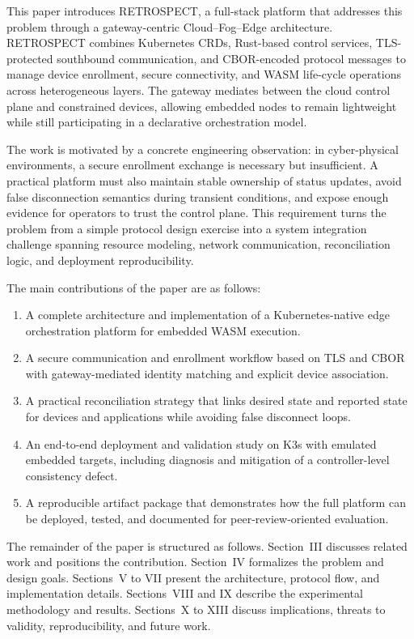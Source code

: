 This paper introduces RETROSPECT, a full-stack platform that addresses this problem through a gateway-centric Cloud--Fog--Edge architecture. RETROSPECT combines Kubernetes CRDs, Rust-based control services, TLS-protected southbound communication, and CBOR-encoded protocol messages to manage device enrollment, secure connectivity, and WASM life-cycle operations across heterogeneous layers. The gateway mediates between the cloud control plane and constrained devices, allowing embedded nodes to remain lightweight while still participating in a declarative orchestration model.

The work is motivated by a concrete engineering observation: in cyber-physical environments, a secure enrollment exchange is necessary but insufficient. A practical platform must also maintain stable ownership of status updates, avoid false disconnection semantics during transient conditions, and expose enough evidence for operators to trust the control plane. This requirement turns the problem from a simple protocol design exercise into a system integration challenge spanning resource modeling, network communication, reconciliation logic, and deployment reproducibility.

The main contributions of the paper are as follows:
\begin{enumerate}
    \item A complete architecture and implementation of a Kubernetes-native edge orchestration platform for embedded WASM execution.
    \item A secure communication and enrollment workflow based on TLS and CBOR with gateway-mediated identity matching and explicit device association.
    \item A practical reconciliation strategy that links desired state and reported state for devices and applications while avoiding false disconnect loops.
    \item An end-to-end deployment and validation study on K3s with emulated embedded targets, including diagnosis and mitigation of a controller-level consistency defect.
    \item A reproducible artifact package that demonstrates how the full platform can be deployed, tested, and documented for peer-review-oriented evaluation.
\end{enumerate}

The remainder of the paper is structured as follows. Section~III discusses related work and positions the contribution. Section~IV formalizes the problem and design goals. Sections~V to VII present the architecture, protocol flow, and implementation details. Sections~VIII and IX describe the experimental methodology and results. Sections~X to XIII discuss implications, threats to validity, reproducibility, and future work.

